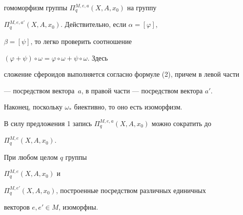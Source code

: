 \begin{pf}
гомоморфизм группы $\Pi^{M,e,a}_q(X,A,x_0)$ на группу 


$\Pi^{M,e,a'}_q(X,A,x_0)$. Действительно, если $\alpha=[\varphi]$, 


$\beta=[\psi]$, то легко проверить соотношение 


$(\varphi+\psi)\circ\omega=\varphi\circ\omega+\psi\circ\omega$. Здесь 


сложение сфероидов выполняется согласно формуле (2), причем в левой части 


--- посредством вектора~$a$, в правой части --- посредством вектора $a'$. 


Наконец, поскольку $\omega_*$ биективно, то оно есть изоморфизм. 


\end{pf} 


 


В силу предложения 1 запись $\Pi^{M,e,a}_q(X,A,x_0)$ можно сократить до 


$\Pi^{M,e}_q(X,A,x_0)$. 


 


\begin{prop} 


При любом целом $q$ группы 


$\Pi^{M,e}_q(X,A,x_0)$ и 


$\Pi^{M,e'}_q(X,A,x_0)$, построенные посредством различных единичных 


векторов $e,e'\in M$, изоморфны. 


\end{prop} 


 


